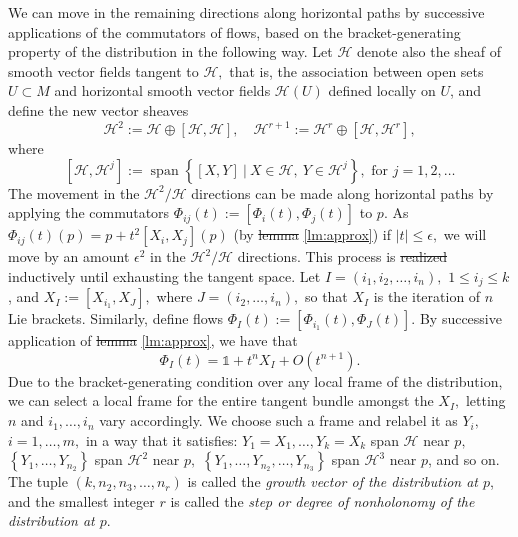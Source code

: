 \documentclass[12pt, letterpaper, reqno]{amsart}
\theoremstyle{definition}
\theoremstyle{plain}
\theoremstyle{remark}
\providecommand{\DIFadd}[1]{{\protect\color{blue}\uwave{#1}}} %
\providecommand{\DIFdel}[1]{{\protect\color{red}\sout{#1}}}                      %
\providecommand{\DIFaddbegin}{} %
\providecommand{\DIFaddend}{} %
\providecommand{\DIFdelbegin}{} %
\providecommand{\DIFdelend}{} %
\newcommand{\DIFscaledelfig}{0.5}
\newlength{\DIFdelgraphicswidth} %
\newlength{\DIFdelgraphicsheight} %
\newcommand{\DIFaddincludegraphics}[2][]{{\color{blue}\fbox{\DIFOincludegraphics[#1]{#2}}}} %
\newcommand{\DIFdelincludegraphics}[2][]{%
\sbox{\DIFdelgraphicsbox}{\DIFOincludegraphics[#1]{#2}}%
\settoboxwidth{\DIFdelgraphicswidth}{\DIFdelgraphicsbox} %
\settoboxtotalheight{\DIFdelgraphicsheight}{\DIFdelgraphicsbox} %
\scalebox{\DIFscaledelfig}{%
\parbox[b]{\DIFdelgraphicswidth}{\usebox{\DIFdelgraphicsbox}\\[-\baselineskip] \rule{\DIFdelgraphicswidth}{0em}}\llap{\resizebox{\DIFdelgraphicswidth}{\DIFdelgraphicsheight}{%
\setlength{\unitlength}{\DIFdelgraphicswidth}%
\begin{picture}(1,1)%
\thicklines\linethickness{2pt} %
{\color[rgb]{1,0,0}\put(0,0){\framebox(1,1){}}}%
{\color[rgb]{1,0,0}\put(0,0){\line( 1,1){1}}}%
{\color[rgb]{1,0,0}\put(0,1){\line(1,-1){1}}}%
\end{picture}%
}\hspace*{3pt}}} %
} %
\DeclareRobustCommand{\DIFaddbegin}{\DIFOaddbegin \let\includegraphics\DIFaddincludegraphics} %
\DeclareRobustCommand{\DIFaddend}{\DIFOaddend \let\includegraphics\DIFOincludegraphics} %
\DeclareRobustCommand{\DIFdelbegin}{\DIFOdelbegin \let\includegraphics\DIFdelincludegraphics} %
\DeclareRobustCommand{\DIFdelend}{\DIFOaddend \let\includegraphics\DIFOincludegraphics} %
\begin{document}
We can move in the remaining directions along horizontal paths by successive applications of the commutators of flows, based on the bracket-generating property of the distribution in the following way. Let $ \mathcal{H} $ denote also the sheaf of smooth vector fields tangent to $ \mathcal{H}, $ that is, the association between open sets $ U\subset M $ and horizontal smooth vector fields $ \mathcal{H}(U) $ defined locally on $ U $, and define the new vector sheaves
$$ \mathcal{H}^2 := \mathcal{H}\oplus [\mathcal{H},\mathcal{H}],\quad \mathcal{H}^{r+1} := \mathcal{H}^r\oplus [\mathcal{H}, \mathcal{H}^r], $$
where
$$ \left[ \mathcal{H}, \mathcal{H}^j \right]:= \operatorname{span} \left\{ [X,Y] \ | \ X\in \mathcal{H},\ Y \in \mathcal{H}^j \right\}, \text{ for }j=1,2,\dots  $$ 
The movement in the $ \mathcal{H}^2/\mathcal{H} $ directions can be made along horizontal paths by applying the commutators $ \Phi_{ij}(t):= [\Phi_i(t),\Phi_j(t)] $ to $ p. $ As $ \Phi_{ij}(t)(p)=p+t^2[X_i, X_j](p) $ (by \DIFdelbegin \DIFdel{lemma }\DIFdelend \DIFaddbegin \DIFadd{Lemma }\DIFaddend \ref{lm:approx}) if $ |t|\leq\epsilon, $ we will move by an amount $ \epsilon^2 $ in the $ \mathcal{H}^2/\mathcal{H} $ directions. This process is \DIFdelbegin \DIFdel{realized }\DIFdelend \DIFaddbegin \DIFadd{done }\DIFaddend inductively until exhausting the \DIFaddbegin \DIFadd{entire }\DIFaddend tangent space. Let $ I=(i_1,i_2,\dots,i_n), $ $ 1\leq i_j\leq k $, and $ X_I:=[X_{i_1}, X_J], $ where $ J=(i_2,\dots,i_n), $  so that $ X_I $ is the iteration of $ n $ Lie brackets. Similarly, define flows $ \Phi_I(t):=[\Phi_{i_1}(t), \Phi_J(t)] $. By successive application of \DIFdelbegin \DIFdel{lemma }\DIFdelend \DIFaddbegin \DIFadd{Lemma }\DIFaddend \ref{lm:approx}, we have that   
$$ \Phi_I(t)= \mathbb{1} +t^n X_I+ O(t^{n+1}).$$ 
Due to the bracket-generating condition over any local frame of the distribution, we can select a local frame for the entire tangent bundle amongst the $ X_I, $ letting $ n $ and $ i_1,\dots,i_n $ vary accordingly. We choose such a frame and relabel it as $ Y_i, $ $ i=1,\dots,m, $ in a way that it satisfies: $ Y_1=X_1,\dots, Y_k=X_k $ span $ \mathcal{H} $ near $ p, $ $ \left\{ Y_1,\dots,Y_{n_2} \right\} $ span $ \mathcal{H}^2 $ near $ p, $ $ \left\{ Y_1,\dots,Y_{n_2},\dots,Y_{n_3} \right\} $ span $ \mathcal{H}^3 $ near $ p $,  and so on. The tuple $ (k,n_2,n_3,\dots, n_r) $ is called the \textit{growth vector of the distribution at $ p $}, and the smallest integer $ r $ is called the \textit{step or degree of nonholonomy of the distribution at $ p. $ }   
\end{document}
